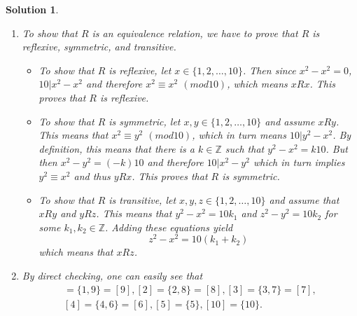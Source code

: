 \documentclass[12pt]{article}
\newtheorem*{solution}{Solution}
\begin{document}
\begin{enumerate}
\begin{solution}
\begin{enumerate}
\item To show that $R$ is an equivalence relation, we have to prove that $R$ is reflexive, symmetric, and transitive.
\begin{itemize}
\item To show that $R$ is reflexive, let $x\in\{1,2,\dots,10\}$. Then since $x^2-x^2=0$, $10|x^2-x^2$ and therefore $x^2\equiv x^2$ $(mod 10)$, which means $xRx$. This proves that $R$ is reflexive.
\item To show that $R$ is symmetric, let $x,y\in\{1,2,\dots,10\}$ and assume $xRy$. This means that $x^2\equiv y^2$ $(mod 10)$, which in turn means $10|y^2-x^2$. By definition, this means that there is a $k\in\mathbb{Z}$ such that $y^2-x^2=k10$. But then $x^2-y^2=(-k)10$ and therefore $10|x^2-y^2$ which in turn implies $y^2\equiv x^2$ and thus $yRx$. This proves that $R$ is symmetric.
\item To show that $R$ is transitive, let $x,y,z\in\{1,2,\dots,10\}$ and assume that $xRy$ and $yRz$. This means that $y^2-x^2=10k_1$ and $z^2-y^2=10k_2$ for some $k_1,k_2\in\mathbb{Z}$. Adding these equations yield
\[
z^2-x^2=10(k_1+k_2)
\]
which means that $xRz$. 
\end{itemize}
\item By direct checking, one can easily see that
\begin{align*}
[1]=\{1,9\}=[9], [2]=\{2,8\}=[8], [3]=\{3,7\}=[7],\\
[4]=\{4,6\}=[6], [5]=\{5\}, [10]=\{10\}.
\end{align*}
\end{enumerate}
\end{solution}


\end{enumerate}
\end{document}
